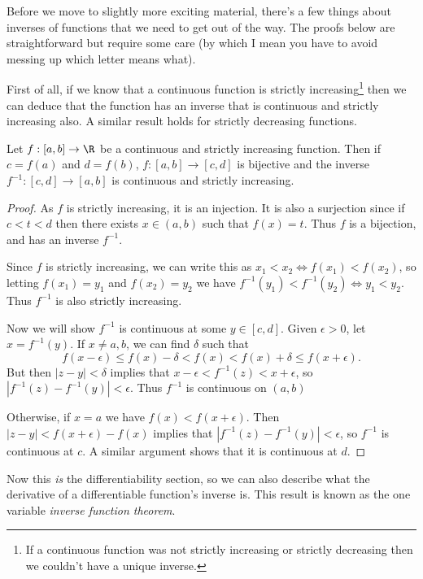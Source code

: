 Before we move to slightly more exciting material, there's a few things about inverses of functions that we need to get out of the way. The proofs below are straightforward but require some care (by which I mean you have to avoid messing up which letter means what).

First of all, if we know that a continuous function is strictly increasing\footnote{If a continuous function was not strictly increasing or strictly decreasing then we couldn't have a unique inverse.} then we can deduce that the function has an inverse that is continuous and strictly increasing also. A similar result holds for strictly decreasing functions.

\begin{theorem}
	Let $f:[a, b] \rightarrow \R$ be a continuous and strictly increasing function. Then if $c = f(a)$ and $d = f(b)$, $f:[a, b] \rightarrow [c, d]$ is bijective and the inverse $f^{-1}: [c, d] \rightarrow [a, b]$ is continuous and strictly increasing.
\end{theorem}
\begin{proof}
	As $f$ is strictly increasing, it is an injection. It is also a surjection since if $c < t < d$ then there exists $x \in (a, b)$ such that $f(x) = t$. Thus $f$ is a bijection, and has an inverse $f^{-1}$.

	Since $f$ is strictly increasing, we can write this as $x_1 < x_2 \iff f(x_1) < f(x_2)$, so letting $f(x_1) = y_1$ and $f(x_2) = y_2$ we have 
	$f^{-1}(y_1) < f^{-1}(y_2) \iff y_1 < y_2$. Thus $f^{-1}$ is also strictly increasing.
	
	Now we will show $f^{-1}$ is continuous at some $y \in [c, d]$.
	Given $\epsilon > 0$, 
	let $x = f^{-1}(y)$. If $x \neq a, b$, we can find $\delta$ such that
	$$
		f(x - \epsilon) \leq f(x) - \delta < f(x) < f(x) + \delta \leq f(x + \epsilon).
	$$
	But then $|z - y| < \delta$ implies that $x - \epsilon < f^{-1}(z) < x + \epsilon$, so $|f^{-1}(z) - f^{-1}(y)| < \epsilon$.
	Thus $f^{-1}$ is continuous on $(a, b)$

	Otherwise, if $x = a$ we have $f(x) < f(x + \epsilon)$. Then $|z - y| < f(x + \epsilon) - f(x)$ implies that $|f^{-1}(z) - f^{-1}(y)| < \epsilon$, so $f^{-1}$ is continuous at $c$. A similar argument shows that it is continuous at $d$.
\end{proof}

Now this \emph{is} the differentiability section, so we can also describe what the derivative of a differentiable function's inverse is. This result is known as the one variable \emph{inverse function theorem}.

